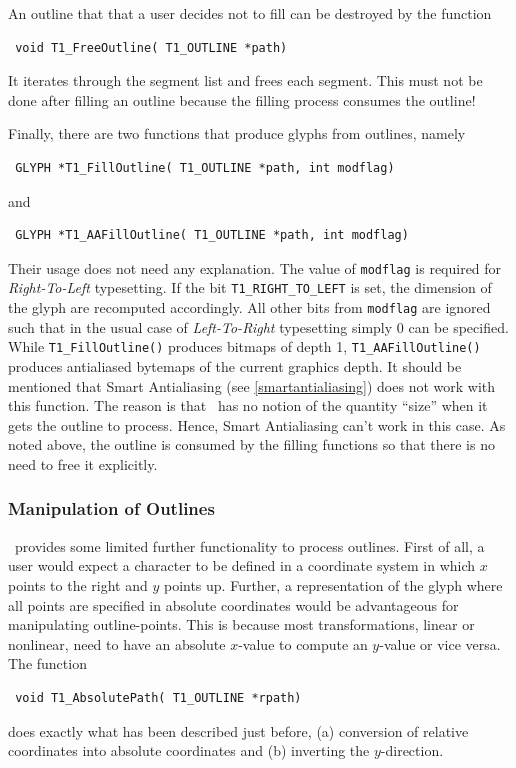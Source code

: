 An outline that that a user decides not to fill can be destroyed by the
function 
\precorr
\begin{verbatim}
 void T1_FreeOutline( T1_OUTLINE *path)
\end{verbatim}\postcorr
It iterates through the segment list and frees each segment.
This must not be done after filling an outline because the filling process
consumes the outline!

Finally, there are two functions that produce glyphs from outlines, namely
\precorr
\begin{verbatim}
 GLYPH *T1_FillOutline( T1_OUTLINE *path, int modflag)
\end{verbatim}\postcorr
and
\precorr
\begin{verbatim}
 GLYPH *T1_AAFillOutline( T1_OUTLINE *path, int modflag)
\end{verbatim}\postcorr
Their usage does not need any explanation. The value of \verb+modflag+ is
required for {\em Right-To-Left} typesetting. If the bit
\verb+T1_RIGHT_TO_LEFT+ is set, the dimension of the glyph are recomputed
accordingly. All other bits from \verb+modflag+ are ignored such that in the
usual case of {\em Left-To-Right} typesetting simply 0 can be specified.
While \verb+T1_FillOutline()+ produces bitmaps of depth 1,
\verb+T1_AAFillOutline()+ produces antialiased bytemaps of the current
graphics depth. It should be mentioned that Smart Antialiasing (see
\ref{smartantialiasing}) does not work with this function. The reason is that
\tonelib\ has no notion of the quantity ``size'' when it gets the outline to
process. Hence, Smart Antialiasing can't work in this case. As noted above,
the outline is consumed by the filling functions so that there is no need to
free it explicitly.

 
\subsubsection{Manipulation of Outlines}
\label{outlinemanipulation}%
\tonelib\ provides some limited further functionality to process
outlines. First of all, a user would expect a character to be defined in a
coordinate system in which $x$ points to the right and $y$ points up. Further,
a representation of the glyph where all points are specified in absolute
coordinates would be advantageous for manipulating outline-points. This is
because most transformations, linear or nonlinear, need to have an absolute
$x$-value to compute an $y$-value or vice versa. The function
\precorr
\begin{verbatim}
 void T1_AbsolutePath( T1_OUTLINE *rpath)
\end{verbatim}\postcorr
does exactly what has been described just before, (a) conversion of relative
coordinates into absolute coordinates and (b) inverting the
$y$-direction. 

